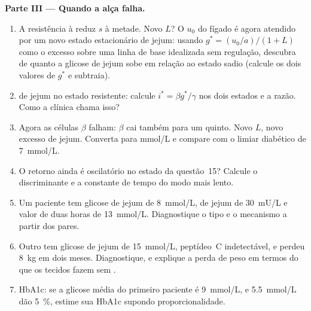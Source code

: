 \begin{problem}
\medskip
\noindent\textbf{Parte III --- Quando a alça falha.}
\begin{enumerate}[resume]
  \item A resistência à  reduz $s$ à metade. Novo $L$? O $u_{0}$
        do fígado é agora atendido por um novo estado estacionário de
        jejum: usando $g^{*} = (u_{0}/a)/(1
        + L)$ como o excesso sobre
        uma linha de base idealizada sem regulação, descubra de quanto a
        glicose de jejum sobe em relação ao estado sadio (calcule os dois
        valores de $g^{*}$ e subtraia).
  \item {} de jejum no estado resistente: calcule $i^{*} = \beta
        g^{*}/\gamma$ nos dois estados e a razão. Como a clínica chama
        isso?
  \item Agora as células $\beta$ falham: $\beta$ cai também para um
        quinto. Novo $L$, novo excesso de jejum. Converta para mmol/L e
        compare com o limiar diabético de \qty{7}{mmol/L}.
  \item O retorno ainda é oscilatório no estado da questão~15? Calcule o
        discriminante e a constante de tempo do modo mais lento.
  \item Um paciente tem glicose de jejum de \qty{8}{mmol/L},  de
        jejum de \qty{30}{mU/L} e valor de duas horas de \qty{13}{mmol/L}.
        Diagnostique o tipo e o mecanismo a partir dos pares.
  \item Outro tem glicose de jejum de \qty{15}{mmol/L}, peptídeo~C
        indetectável, e perdeu \qty{8}{kg} em dois meses. Diagnostique, e
        explique a perda de peso em termos do que os tecidos fazem sem
        .
  \item HbA1c: se a glicose média do primeiro paciente é \qty{9}{mmol/L},
        e \qty{5.5}{mmol/L} dão \qty{5}{\%}, estime sua HbA1c supondo
        proporcionalidade.
\end{enumerate}


\end{problem}
